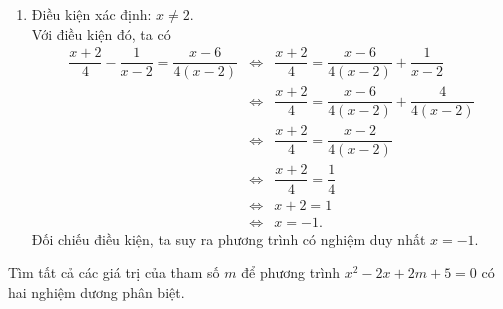 \begin{bt}
{\begin{enumerate}
Vậy, tập nghiệm của phương trình là $S=\{0; 3\}$.
\item Điều kiện xác định: $x\ne 2$.\\
Với điều kiện đó, ta có\\
\begin{eqnarray*}
\dfrac{x+2}{4}-\dfrac{1}{x-2}=\dfrac{x-6}{4(x-2)} &\Leftrightarrow & \dfrac{x+2}{4}=\dfrac{x-6}{4(x-2)}+\dfrac{1}{x-2}\\
&\Leftrightarrow & \dfrac{x+2}{4}=\dfrac{x-6}{4(x-2)}+\dfrac{4}{4(x-2)}\\
&\Leftrightarrow & \dfrac{x+2}{4}=\dfrac{x-2}{4(x-2)}\\
&\Leftrightarrow & \dfrac{x+2}{4}=\dfrac{1}{4}\\
&\Leftrightarrow & x+2=1\\
&\Leftrightarrow & x=-1.
\end{eqnarray*}
Đối chiếu điều kiện, ta suy ra phương trình có nghiệm duy nhất $x=-1$.
\end{enumerate}
}
\end{bt}

\begin{bt}%
Tìm tất cả các giá trị của tham số $m$ để phương trình $x^2-2x+2m+5=0$ có hai nghiệm dương phân biệt.
\end{bt}


